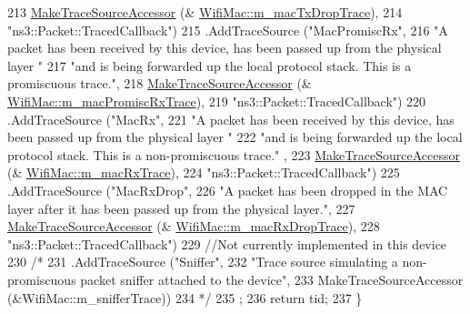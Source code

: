 \begin{DoxyCode}
213                      \hyperlink{group__tracing_gab21a770b9855af4e8f69f7531ea4a6b0}{MakeTraceSourceAccessor} (&
      \hyperlink{classns3_1_1WifiMac_a8d28777a4c6f2a8c7514f0c6f93da79e}{WifiMac::m\_macTxDropTrace}),
214                      \textcolor{stringliteral}{"ns3::Packet::TracedCallback"})
215     .AddTraceSource (\textcolor{stringliteral}{"MacPromiscRx"},
216                      \textcolor{stringliteral}{"A packet has been received by this device, has been passed up from the physical layer
       "}
217                      \textcolor{stringliteral}{"and is being forwarded up the local protocol stack.  This is a promiscuous trace."},
218                      \hyperlink{group__tracing_gab21a770b9855af4e8f69f7531ea4a6b0}{MakeTraceSourceAccessor} (&
      \hyperlink{classns3_1_1WifiMac_aadb7693e9a6c397391c48a90b6773976}{WifiMac::m\_macPromiscRxTrace}),
219                      \textcolor{stringliteral}{"ns3::Packet::TracedCallback"})
220     .AddTraceSource (\textcolor{stringliteral}{"MacRx"},
221                      \textcolor{stringliteral}{"A packet has been received by this device, has been passed up from the physical layer
       "}
222                      \textcolor{stringliteral}{"and is being forwarded up the local protocol stack. This is a non-promiscuous trace."}
      ,
223                      \hyperlink{group__tracing_gab21a770b9855af4e8f69f7531ea4a6b0}{MakeTraceSourceAccessor} (&
      \hyperlink{classns3_1_1WifiMac_a89965d25d0d4b93890534e2dd2a31e2f}{WifiMac::m\_macRxTrace}),
224                      \textcolor{stringliteral}{"ns3::Packet::TracedCallback"})
225     .AddTraceSource (\textcolor{stringliteral}{"MacRxDrop"},
226                      \textcolor{stringliteral}{"A packet has been dropped in the MAC layer after it has been passed up from the
       physical layer."},
227                      \hyperlink{group__tracing_gab21a770b9855af4e8f69f7531ea4a6b0}{MakeTraceSourceAccessor} (&
      \hyperlink{classns3_1_1WifiMac_aaacf17caeadb826164ee3efbc87fecd5}{WifiMac::m\_macRxDropTrace}),
228                      \textcolor{stringliteral}{"ns3::Packet::TracedCallback"})
229     \textcolor{comment}{//Not currently implemented in this device}
230     \textcolor{comment}{/*}
231 \textcolor{comment}{    .AddTraceSource ("Sniffer",}
232 \textcolor{comment}{                     "Trace source simulating a non-promiscuous packet sniffer attached to the device",}
233 \textcolor{comment}{                     MakeTraceSourceAccessor (&WifiMac::m\_snifferTrace))}
234 \textcolor{comment}{    */}
235   ;
236   \textcolor{keywordflow}{return} tid;
237 \}
\end{DoxyCode}


